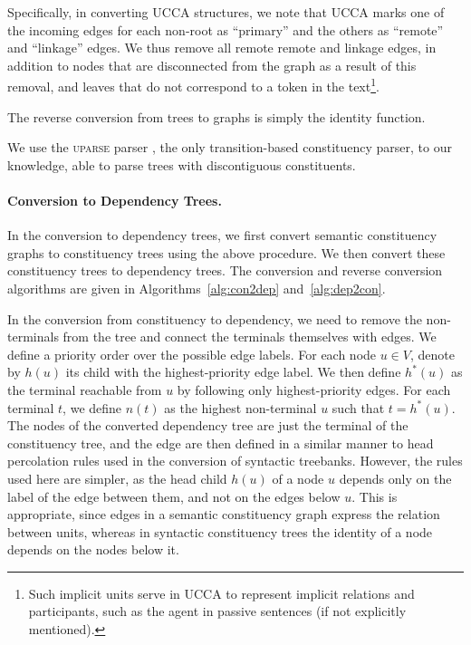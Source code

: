 \documentclass[11pt]{article}
\begin{document}
Specifically, in converting UCCA structures, we note that UCCA marks one of the incoming edges
for each non-root as ``primary'' and the others as ``remote'' and ``linkage'' edges.
We thus remove all remote remote and linkage edges, in addition to nodes that are disconnected
from the graph as a result of this removal, and leaves that do not correspond to a token in the
text\footnote{Such implicit units serve in UCCA to represent implicit relations and participants, such as
the agent in passive sentences (if not explicitly mentioned).}.

The reverse conversion from trees to graphs is simply the identity function.

We use the \textsc{uparse} parser \cite{maier2015discontinuous}, the only transition-based
constituency parser, to our knowledge, able to parse trees with discontiguous constituents.

\paragraph{Conversion to Dependency Trees.}\label{subsec:con2dep}
In the conversion to dependency trees, we first convert semantic constituency graphs to constituency trees using the above procedure. We then convert these constituency trees to dependency trees. The conversion and reverse conversion algorithms are given in Algorithms~\ref{alg:con2dep} and~\ref{alg:dep2con}.

In the conversion from constituency to dependency, we need to remove the non-terminals from the tree and connect the terminals themselves with edges.
We define a priority order over the possible edge labels.
For each node $u \in V$, denote by $h(u)$ its child with the highest-priority edge label.
We then define $h^*(u)$ as the terminal reachable from $u$ by following only highest-priority edges.
For each terminal $t$, we define $n(t)$ as the highest non-terminal $u$ such that $t=h^*(u)$.
The nodes of the converted dependency tree are just the terminal of the constituency tree,
and the edge are then defined in a similar manner to head percolation rules used in the conversion of syntactic treebanks.
However, the rules used here are simpler, as the head child $h(u)$ of a node $u$ depends only on the label of the edge between them, and not on the edges below $u$. This is appropriate, since edges in a semantic constituency graph express the relation between units, whereas in syntactic constituency trees the identity of a node depends on the nodes below it.
\end{document}
